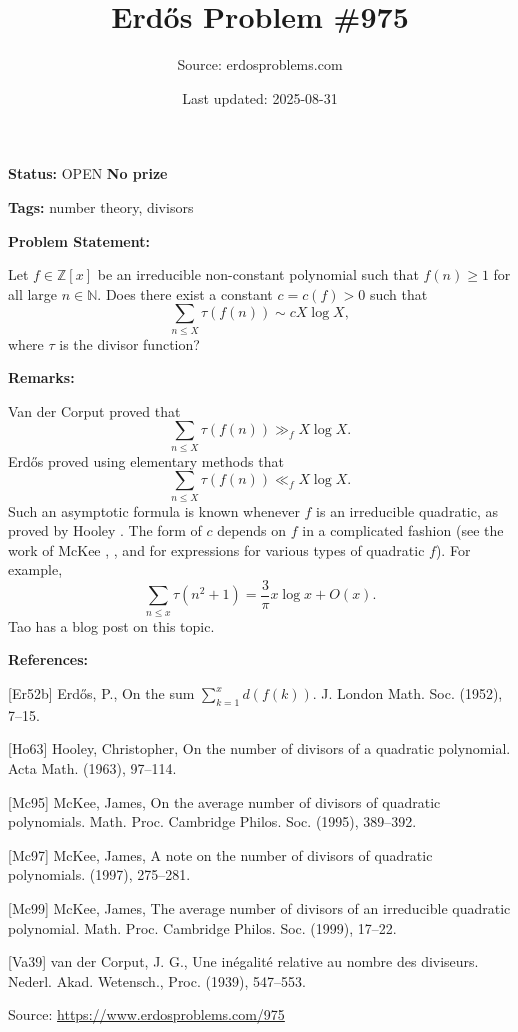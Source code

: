 \documentclass{article}
\title{Erd\H{o}s Problem \#975}
\date{Last updated: 2025-08-31}
\author{Source: erdosproblems.com}
\begin{document}
\maketitle

\noindent\textbf{Status:} OPEN \quad \textbf{No prize}

\noindent\textbf{Tags:} number theory, divisors

\medskip
\noindent\textbf{Problem Statement:}

Let $f\in \mathbb{Z}[x]$ be an irreducible non-constant polynomial such that $f(n)\geq 1$ for all large $n\in\mathbb{N}$. Does there exist a constant $c=c(f)>0$ such that\[\sum_{n\leq X} \tau(f(n))\sim cX\log X,\]where $\tau$ is the divisor function?

\bigskip
\noindent\textbf{Remarks:}

Van der Corput \cite{Va39} proved that\[\sum_{n\leq X} \tau(f(n))\gg_f X\log X.\]Erd\H{o}s \cite{Er52b} proved using elementary methods that\[\sum_{n\leq X} \tau(f(n))\ll_f X\log X.\]Such an asymptotic formula is known whenever $f$ is an irreducible quadratic, as proved by Hooley \cite{Ho63}. The form of $c$ depends on $f$ in a complicated fashion (see the work of McKee \cite{Mc95}, \cite{Mc97}, and \cite{Mc99} for expressions for various types of quadratic $f$). For example,\[\sum_{n\leq x}\tau(n^2+1)=\frac{3}{\pi}x\log x+O(x).\]Tao has a blog post on this topic.

\bigskip
\noindent\textbf{References:}

[Er52b] Erd\H{o}s, P., On the sum {$\sum^x_{k=1} d(f(k))$}. J. London Math. Soc. (1952), 7--15.
 
 [Ho63] Hooley, Christopher, On the number of divisors of a quadratic polynomial. Acta Math. (1963), 97--114.
 
 [Mc95] McKee, James, On the average number of divisors of quadratic polynomials. Math. Proc. Cambridge Philos. Soc. (1995), 389--392.
 
 [Mc97] McKee, James, A note on the number of divisors of quadratic polynomials. (1997), 275--281.
 
 [Mc99] McKee, James, The average number of divisors of an irreducible quadratic
polynomial. Math. Proc. Cambridge Philos. Soc. (1999), 17--22.
 
 [Va39] van der Corput, J. G., Une in\'{e}galit\'{e}{} relative au nombre des diviseurs. Nederl. Akad. Wetensch., Proc. (1939), 547--553.

\bigskip
\noindent\small{Source: \url{https://www.erdosproblems.com/975}}
\end{document}
